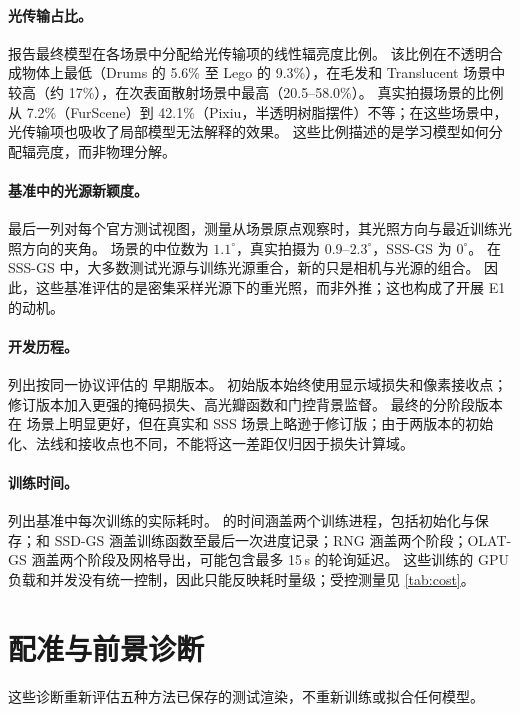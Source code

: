 \documentclass[10pt,twocolumn,letterpaper]{article}
\begin{document}
\paragraph{光传输占比。}
 报告最终模型在各场景中分配给光传输项的线性辐亮度比例。
该比例在不透明合成物体上最低（Drums 的 5.6\% 至 Lego 的 9.3\%），在毛发和 Translucent 场景中较高（约 17\%），在次表面散射场景中最高（20.5--58.0\%）。
真实拍摄场景的比例从 7.2\%（FurScene）到 42.1\%（Pixiu，半透明树脂摆件）不等；在这些场景中，光传输项也吸收了局部模型无法解释的效果。
这些比例描述的是学习模型如何分配辐亮度，而非物理分解。



\paragraph{基准中的光源新颖度。}
 最后一列对每个官方测试视图，测量从场景原点观察时，其光照方向与最近训练光照方向的夹角。
\gsthree 场景的中位数为 $1.1^\circ$，真实拍摄为 0.9--$2.3^\circ$，SSS-GS 为 $0^\circ$。
在 SSS-GS 中，大多数测试光源与训练光源重合，新的只是相机与光源的组合。
因此，这些基准评估的是密集采样光源下的重光照，而非外推；这也构成了开展 E1 的动机。

\paragraph{开发历程。}
 列出按同一协议评估的 \ours 早期版本。
初始版本始终使用显示域损失和像素接收点；修订版本加入更强的掩码损失、高光瓣函数和门控背景监督。
最终的分阶段版本在 \gsthree 场景上明显更好，但在真实和 SSS 场景上略逊于修订版；由于两版本的初始化、法线和接收点也不同，不能将这一差距仅归因于损失计算域。



\paragraph{训练时间。}
 列出基准中每次训练的实际耗时。
\ours 的时间涵盖两个训练进程，包括初始化与保存；\gsthree 和 SSD-GS 涵盖训练函数至最后一次进度记录；RNG 涵盖两个阶段；OLAT-GS 涵盖两个阶段及网格导出，可能包含最多 15\,s 的轮询延迟。
这些训练的 GPU 负载和并发没有统一控制，因此只能反映耗时量级；受控测量见 \cref{tab:cost}。





\section{配准与前景诊断}
\label{sec:s_registration}
这些诊断重新评估五种方法已保存的测试渲染，不重新训练或拟合任何模型。
\end{document}
